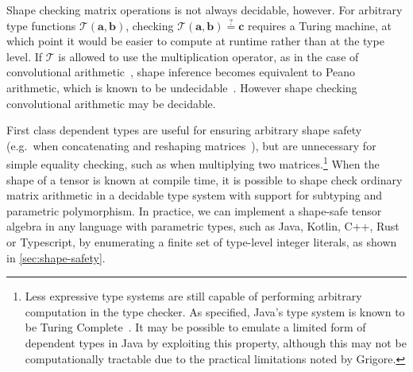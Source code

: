 \documentclass[12pt,initial,twoside,maitrise]{dms}
\numberwithin{equation}{section}
\numberwithin{table}{chapter}
\numberwithin{figure}{chapter}
\begin{document}
Shape checking matrix operations is not always decidable, however. For arbitrary type functions $\mathcal{T}(\mathbf{a}, \mathbf{b})$, checking $\mathcal{T}(\mathbf{a}, \mathbf{b}) \stackrel{?}{=} \mathbf{c}$ requires a Turing machine, at which point it would be easier to compute at runtime rather than at the type level. If $\mathcal{T}$ is allowed to use the multiplication operator, as in the case of convolutional arithmetic~\citep{dumoulin2016guide}, shape inference becomes equivalent to Peano arithmetic, which is known to be undecidable~\citep{godel1931formal}. However shape checking convolutional arithmetic may be decidable.

First class dependent types are useful for ensuring arbitrary shape safety (e.g.\ when concatenating and reshaping matrices~\citep{xi1998eliminating}), but are unnecessary for simple equality checking, such as when multiplying two matrices.\footnote{Less expressive type systems are still capable of performing arbitrary computation in the type checker. As specified, Java's type system is known to be Turing Complete~\citep{Grigore:2017:JGT:3009837.3009871}. It may be possible to emulate a limited form of dependent types in Java by exploiting this property, although this may not be computationally tractable due to the practical limitations noted by Grigore.} When the shape of a tensor is known at compile time, it is possible to shape check ordinary matrix arithmetic in a decidable type system with support for subtyping and parametric polymorphism. In practice, we can implement a shape-safe tensor algebra in any language with parametric types, such as Java, Kotlin, C++, Rust or Typescript, by enumerating a finite set of type-level integer literals, as shown in \autoref{sec:shape-safety}.
\end{document}
